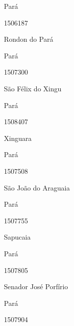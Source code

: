 \documentclass[
  letterpaper,
]{report}
\begin{document}
\n      

Pará

\n      

1506187

\n      

Rondon do Pará

\n    

\n    

\n      

Pará

\n      

1507300

\n      

São Félix do Xingu

\n    

\n    

\n      

Pará

\n      

1508407

\n      

Xinguara

\n    

\n    

\n      

Pará

\n      

1507508

\n      

São João do Araguaia

\n    

\n    

\n      

Pará

\n      

1507755

\n      

Sapucaia

\n    

\n    

\n      

Pará

\n      

1507805

\n      

Senador José Porfírio

\n    

\n    

\n      

Pará

\n      

1507904

\n      
\end{document}
